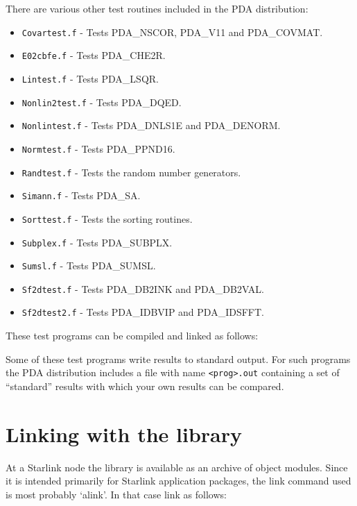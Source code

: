 \documentclass[11pt,twoside,nolof]{starlink}
\begin{document}
   There are various other test routines included in the PDA distribution:
\begin{itemize}
\item \texttt{Covartest.f} - Tests PDA\_NSCOR, PDA\_V11 and PDA\_COVMAT.
\item \texttt{E02cbfe.f} - Tests PDA\_CHE2R.
\item \texttt{Lintest.f} - Tests PDA\_LSQR.
\item \texttt{Nonlin2test.f} - Tests PDA\_DQED.
\item \texttt{Nonlintest.f} - Tests PDA\_DNLS1E and PDA\_DENORM.
\item \texttt{Normtest.f} - Tests PDA\_PPND16.
\item \texttt{Randtest.f} - Tests the random number generators.
\item \texttt{Simann.f} - Tests PDA\_SA.
\item \texttt{Sorttest.f} - Tests the sorting routines.
\item \texttt{Subplex.f} - Tests PDA\_SUBPLX.
\item \texttt{Sumsl.f} - Tests PDA\_SUMSL.
\item \texttt{Sf2dtest.f} - Tests PDA\_DB2INK and PDA\_DB2VAL.
\item \texttt{Sf2dtest2.f} - Tests PDA\_IDBVIP and PDA\_IDSFFT.
\end{itemize}

These test programs can be compiled and linked as follows:

\begin{terminalv}
\end{terminalv}

Some of these test programs write results to standard output. For such
programs the PDA distribution includes a file with name \verb+<prog>.out+
containing a set of ``standard'' results with which your own results can
be compared.


\section{\label{LINKING}Linking with the library}

   At a Starlink node the library is available as an archive of object
   modules. Since it is intended
   primarily for Starlink application packages, the link command used is
   most probably `alink'. In that case link as follows:
\end{document}
